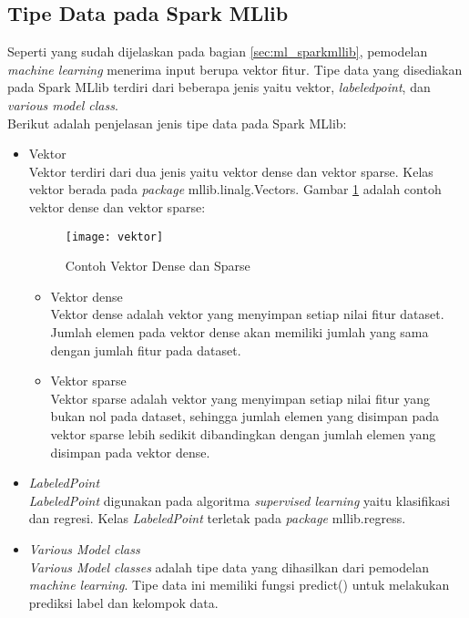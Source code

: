 \subsection{Tipe Data pada Spark MLlib}
Seperti yang sudah dijelaskan pada bagian \ref{sec:ml_sparkmllib}, pemodelan \textit{machine learning} menerima input berupa vektor fitur. Tipe data yang disediakan pada Spark MLlib terdiri dari beberapa jenis yaitu vektor, \textit{labeledpoint}, dan \textit{various model class}. \\

\noindent Berikut adalah penjelasan jenis tipe data pada Spark MLlib:

\begin{itemize}
\item Vektor\\
Vektor terdiri dari dua jenis yaitu vektor dense dan vektor sparse. Kelas vektor berada pada \textit{package} mllib.linalg.Vectors. Gambar \ref{fig:vektor} adalah contoh vektor dense dan vektor sparse:

\begin{figure}[H]
	\centering
	\texttt{[image: vektor]}
	\caption{Contoh Vektor Dense dan Sparse}
	\label{fig:vektor}
\end{figure}

\begin{itemize}

\item Vektor dense\\
Vektor dense adalah vektor yang menyimpan setiap nilai fitur dataset. Jumlah elemen pada vektor dense akan memiliki jumlah yang sama dengan jumlah fitur pada dataset.

\item Vektor sparse\\
Vektor sparse adalah vektor yang menyimpan setiap nilai fitur yang bukan nol pada dataset, sehingga jumlah elemen yang disimpan pada vektor sparse lebih sedikit dibandingkan dengan jumlah elemen yang disimpan pada vektor dense. 

\end{itemize}

\item \textit{LabeledPoint}\\
\textit{LabeledPoint} digunakan pada algoritma \textit{supervised learning} yaitu klasifikasi dan regresi. Kelas \textit{LabeledPoint} terletak pada \textit{package} mllib.regress.

\item \textit{Various Model class}\\
\textit{Various Model classes} adalah tipe data yang dihasilkan dari pemodelan \textit{machine learning}. Tipe data ini memiliki fungsi predict() untuk melakukan prediksi label dan kelompok data.

\end{itemize}

